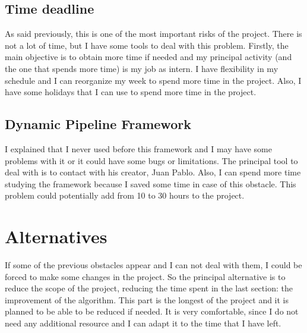 \subsection*{Time deadline}
As said previously, this is one of the most important risks of the project. There is not a lot of time, but I have some tools to deal with this problem.
Firstly, the main objective is to obtain more time if needed and my principal activity (and the one that spends more time) is my job as intern.
I have flexibility in my schedule and I can reorganize my week to spend more time in the project.
Also, I have some holidays that I can use to spend more time in the project.
\subsection*{Dynamic Pipeline Framework}
I explained that I never used before this framework and I may have some problems with it or it could have some bugs or limitations.
The principal tool to deal with is to contact with his creator, Juan Pablo. Also, I can spend more time studying the framework because I saved some time in case of this obstacle.
This problem could potentially add from 10 to 30 hours to the project.
\section{Alternatives}
If some of the previous obstacles appear and I can not deal with them, I could be forced to make some changes in the project.
So the principal alternative is to reduce the scope of the project, reducing the time spent in the last section: the improvement of the algorithm.
This part is the longest of the project and it is planned to be able to be reduced if needed.
It is very comfortable, since I do not need any additional resource and I can adapt it to the time that I have left.
